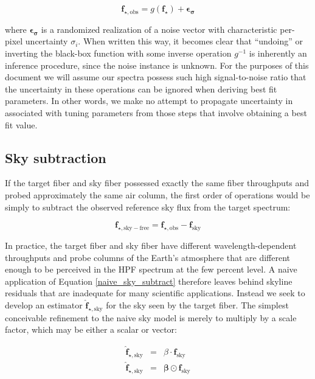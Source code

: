 \documentclass[modern]{aastex631}
\begin{document}
\begin{equation}
\mathbf{f}_{\star, \mathrm{obs}} = g(\mathbf{f}_{\star}) + \boldsymbol{\epsilon_\sigma}
\end{equation}

where $\boldsymbol{\epsilon_\sigma}$ is a randomized realization of a noise vector with characteristic per-pixel uncertainty $\sigma_i$.  When written this way, it becomes clear that ``undoing'' or inverting the black-box function with some inverse operation $g^{-1}$ is inherently an inference procedure, since the noise instance is unknown.  For the purposes of this document we will assume our spectra possess such high signal-to-noise ratio that the uncertainty in these operations can be ignored when deriving best fit parameters.  In other words, we make no attempt to propagate uncertainty in associated with tuning parameters from those steps that involve obtaining a best fit value.

\subsection{Sky subtraction}
If the target fiber and sky fiber possessed exactly the same fiber throughputs and probed approximately the same air column, the first order of operations would be simply to subtract the observed reference sky flux from the target spectrum:

\begin{equation} \label{naive_sky_subtract}
\mathbf{f}_{\star, \mathrm{sky-free}} = \mathbf{f}_{\star, \mathrm{obs}} - \mathbf{f}_{\mathrm{sky}}
\end{equation}

In practice, the target fiber and sky fiber have different wavelength-dependent throughputs and probe columns of the Earth's atmosphere that are different enough to be perceived in the HPF spectrum at the few percent level.  A naive application of Equation \ref{naive_sky_subtract} therefore leaves behind skyline residuals that are inadequate for many scientific applications.  Instead we seek to develop an estimator $\mathbf{\hat{f}}_{\star, \mathrm{sky}}$ for the sky seen by the target fiber.  The simplest conceivable refinement to the naive sky model is merely to multiply by a scale factor, which may be either a scalar or vector:

\begin{eqnarray}
\mathbf{\hat{f}}_{\star, \mathrm{sky}} &=& \beta\cdot\mathbf{f}_{\mathrm{sky}}\label{refined_sky_subtract_scalar}
\\
\mathbf{\hat{f}}_{\star, \mathrm{sky}} &=& \boldsymbol{\beta}\odot\mathbf{f}_{\mathrm{sky}} \label{refined_sky_subtract_vector}
\end{eqnarray}
\end{document}

